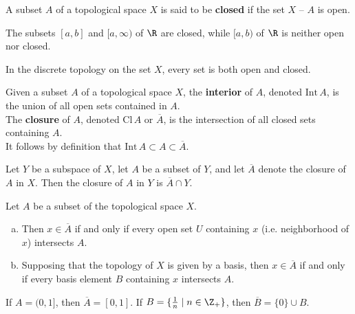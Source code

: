\begin{definition}
A subset $A$ of a topological space $X$ is said to be \textbf{closed} if the set $X \text{ -- } A$ is open. 
\end{definition}

\begin{eg}
The subsets $[a, b]$ and $[a, \infty)$ of $\R$ are closed, while $[a, b)$ of $\R$ is neither open nor closed.
\end{eg}

\begin{eg}
In the discrete topology on the set $X$, every set is both open and closed.
\end{eg}

\begin{definition}
Given a subset $A$ of a topological space $X$, the \textbf{interior} of $A$, denoted $\mathrm{Int} \, A$, is the union of all open sets contained in $A$. \\

The \textbf{closure} of $A$, denoted $\mathrm{Cl} \, A$ or $\overline{A}$, is the intersection of all closed sets containing $A$. \\

It follows by definition that $\mathrm{Int} \, A \subset A \subset \overline{A}$.  
\end{definition}

\begin{theorem}
Let $Y$ be a subspace of $X$, let $A$ be a subset of $Y$, and let $\overline{A}$ denote the closure of $A$ in $X$. Then the closure of $A$ in $Y$ is $\overline{A} \cap Y$.  
\end{theorem}

\begin{theorem}
Let $A$ be a subset of the topological space $X$. 
\begin{enumerate}[a)]
    \item Then $x \in \overline{A}$ if and only if every open set $U$ containing $x$ (i.e. neighborhood of $x$) intersects $A$.
    \item Supposing that the topology of $X$ is given by a basis, then $x \in \overline{A}$ if and only if every
    basis element $B$ containing $x$ intersects $A$.
\end{enumerate}    
\end{theorem}

\begin{eg}
If $A = (0, 1]$, then $\overline{A} = [0, 1]$. If $B = \{ \frac{1}{n} \mid n \in \Z_+ \} $, then $\overline{B} = \{0\} \cup B$.
\end{eg}

